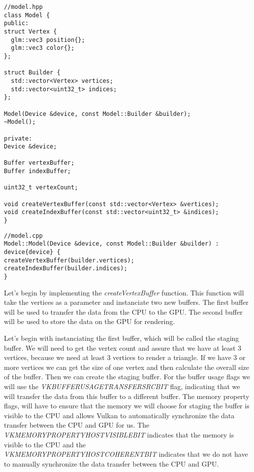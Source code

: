 \documentclass[12pt]{report} \usepackage{preamble}
\begin{document}
\begin{lstlisting}[Language=C++]
//model.hpp
class Model {
public:
struct Vertex {
  glm::vec3 position{};
  glm::vec3 color{};
};

struct Builder {
  std::vector<Vertex> vertices;
  std::vector<uint32_t> indices;
};

Model(Device &device, const Model::Builder &builder);
~Model();

private:
Device &device;

Buffer vertexBuffer;
Buffer indexBuffer;

uint32_t vertexCount;

void createVertexBuffer(const std::vector<Vertex> &vertices);
void createIndexBuffer(const std::vector<uint32_t> &indices);
}
\end{lstlisting}

\begin{lstlisting}[Language=C++]
//model.cpp
Model::Model(Device &device, const Model::Builder &builder) : device{device} {
createVertexBuffer(builder.vertices);
createIndexBuffer(builder.indices);
}
\end{lstlisting}

Let's begin by implementing the \textit{createVertexBuffer} function. This function will take the vertices as a parameter and instanciate two new buffers.
The first buffer will be used to transfer the data from the CPU to the GPU. The second buffer will be used to store the data on the GPU for rendering.

Let's begin with instanciating the first buffer, which will be called the staging buffer.
We will need to get the vertex count and assure that we have at least 3 vertices, because we need at least 3 vertices to render a triangle.
If we have 3 or more vertices we can get the size of one vertex and then calculate the overall size of the buffer.
Then we can create the staging buffer.
For the buffer usage flags we will use the \textit{VK\textunderscore BUFFER\textunderscore USAGE\textunderscore TRANSFER\textunderscore SRC\textunderscore BIT}
flag, indicating that we will transfer the data from this buffer to a different buffer. The memory property flags, will have to ensure
that the memory we will choose for staging the buffer is visible to the CPU and allows Vulkan to automatically synchronize the data transfer between the CPU and GPU
for us. The \textit{VK\textunderscore MEMORY\textunderscore PROPERTY\textunderscore HOST\textunderscore VISIBLE\textunderscore BIT}
indicates that the memory is visible to the CPU and the \\
\textit{VK\textunderscore MEMORY\textunderscore PROPERTY\textunderscore HOST\textunderscore COHERENT\textunderscore BIT}
indicates that we do not have to manually synchronize the data transfer between the CPU and GPU.
\end{document}
